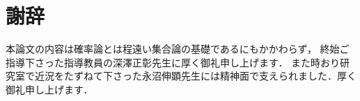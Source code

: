\chapter*{謝辞}
	本論文の内容は確率論とは程遠い集合論の基礎であるにもかかわらず，
	終始ご指導下さった指導教員の深澤正彰先生に厚く御礼申し上げます．
	また時おり研究室で近況をたずねて下さった永沼伸顕先生には精神面で支えられました．厚く御礼申し上げます．
